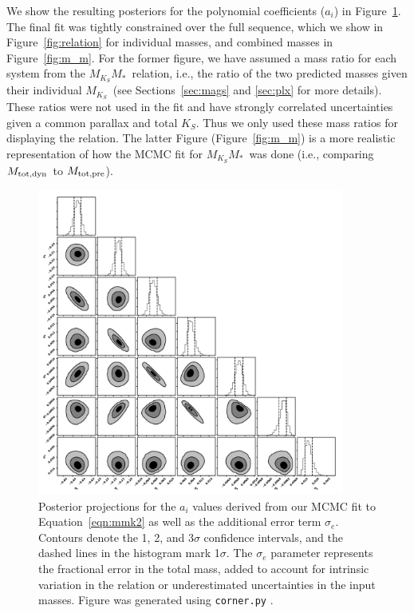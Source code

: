 \documentclass[twocolumn]{aastex62}
\newcommand{\mks}{$M_{K_S}$}
\newcommand{\mmk}{$M_{K_S}$\textendash$M_*$}
\newcommand{\mpred}{$M_{\rm{tot,pre}}$}
\newcommand{\mdyn}{$M_{\rm{tot,dyn}}$}
\begin{document}
We show the resulting posteriors for the polynomial coefficients ($a_i$) in Figure~\ref{fig:fitpost}. The final fit was tightly constrained over the full sequence, which we show in Figure~\ref{fig:relation} for individual masses, and combined masses in Figure~\ref{fig:m_m}. For the former figure, we have assumed a mass ratio for each system from the \mmk\ relation, i.e., the ratio of the two predicted masses given their individual \mks\ (see Sections~\ref{sec:mags} and \ref{sec:plx} for more details). These ratios were not used in the fit and have strongly correlated uncertainties given a common parallax and total $K_S$. Thus we only used these mass ratios for displaying the relation. The latter Figure (Figure~\ref{fig:m_m}) is a more realistic representation of how the MCMC fit for \mmk\ was done (i.e., comparing \mdyn\ to \mpred).

\begin{figure}[p]
\begin{center}
\includegraphics[width=0.9\textwidth]{output_7_eMass.pdf}
\caption{Posterior projections for the $a_i$ values derived from our MCMC fit to Equation~\ref{eqn:mmk2} as well as the additional error term $\sigma_e$. Contours denote the 1, 2, and 3$\sigma$ confidence intervals, and the dashed lines in the histogram mark 1$\sigma$. The $\sigma_e$ parameter represents the fractional error in the total mass, added to account for intrinsic variation in the relation or underestimated uncertainties in the input masses. Figure was generated using {\tt corner.py} \citep{corner}.}
\label{fig:fitpost}
\end{center}
\end{figure}
\end{document}
